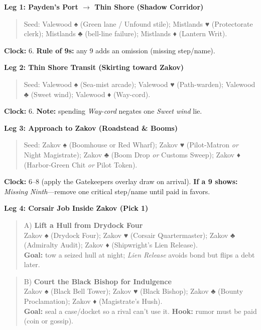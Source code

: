 \documentclass[12pt,oneside]{book}
\renewcommand{\spadesuit}{♠}
\renewcommand{\heartsuit}{♥}
\renewcommand{\clubsuit}{♣}
\renewcommand{\diamondsuit}{♦}
\begin{document}
\textbf{Leg 1: Payden's Port $\rightarrow$ Thin Shore (Shadow Corridor)}
\begin{quote}
Seed: Valewood \spadesuit{} (Green lane / Unfound stile); Mistlands \heartsuit{} (Protectorate clerk); Mistlands \clubsuit{} (bell-line failure); Mistlands \diamondsuit{} (Lantern Writ).
\end{quote}
\textbf{Clock:} 6. \textbf{Rule of 9s:} any 9 adds an omission (missing step/name).

\textbf{Leg 2: Thin Shore Transit (Skirting toward Zakov)}
\begin{quote}
Seed: Valewood \spadesuit{} (Sea-mist arcade); Valewood \heartsuit{} (Path-warden); Valewood \clubsuit{} (Sweet wind); Valewood \diamondsuit{} (Way-cord).
\end{quote}
\textbf{Clock:} 6. \textbf{Note:} spending \emph{Way-cord} negates one \emph{Sweet wind} lie.

\textbf{Leg 3: Approach to Zakov (Roadstead \& Booms)}
\begin{quote}
Seed: Zakov \spadesuit{} (Boomhouse or Red Wharf); Zakov \heartsuit{} (Pilot-Matron \emph{or} Night Magistrate); Zakov \clubsuit{} (Boom Drop \emph{or} Customs Sweep); Zakov \diamondsuit{} (Harbor-Green Chit \emph{or} Pilot Token).
\end{quote}
\textbf{Clock:} 6--8 (apply the Gatekeepers overlay draw on arrival). \textbf{If a 9 shows:} \emph{Missing Ninth}---remove one critical step/name until paid in favors.

\textbf{Leg 4: Corsair Job Inside Zakov (Pick 1)}
\begin{quote}
A) \textbf{Lift a Hull from Drydock Four}\\
Zakov \spadesuit{} (Drydock Four); Zakov \heartsuit{} (Corsair Quartermaster); Zakov \clubsuit{} (Admiralty Audit); Zakov \diamondsuit{} (Shipwright's Lien Release).\\
\textbf{Goal:} tow a seized hull at night; \emph{Lien Release} avoids bond but flips a debt later.
\end{quote}

\begin{quote}
B) \textbf{Court the Black Bishop for Indulgence}\\
Zakov \spadesuit{} (Black Bell Tower); Zakov \heartsuit{} (Black Bishop); Zakov \clubsuit{} (Bounty Proclamation); Zakov \diamondsuit{} (Magistrate's Hush).\\
\textbf{Goal:} seal a case/docket so a rival can't use it. \textbf{Hook:} rumor must be paid (coin or gossip).
\end{quote}
\end{document}
